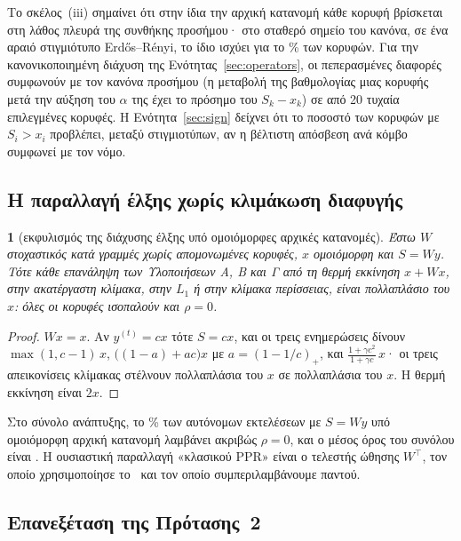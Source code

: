 \documentclass[11pt,a4paper]{article}
\theoremstyle{definition}
\theoremstyle{plain}
\newcommand{\genpropname}{}
\newtheorem*{genprop}{\genpropname}
\newenvironment{prop}[1]{\renewcommand{\genpropname}{Πρόταση #1}\begin{genprop}}{\end{genprop}}
\begin{document}
Το σκέλος~(iii) σημαίνει ότι στην ίδια την αρχική κατανομή κάθε κορυφή βρίσκεται στη λάθος πλευρά της συνθήκης προσήμου· στο σταθερό σημείο του κανόνα, σε ένα αραιό στιγμιότυπο Erdős--Rényi, το ίδιο ισχύει για το \SparseFracSbelowX\% των κορυφών. Για την κανονικοποιημένη διάχυση της Ενότητας~\ref{sec:operators}, οι πεπερασμένες διαφορές συμφωνούν με τον κανόνα προσήμου (η μεταβολή της βαθμολογίας μιας κορυφής μετά την αύξηση του $\alpha$ της έχει το πρόσημο του $S_k-x_k$) σε \SignAgree{} από 20 τυχαία επιλεγμένες κορυφές. Η Ενότητα~\ref{sec:sign} δείχνει ότι το ποσοστό των κορυφών με $S_i>x_i$ προβλέπει, μεταξύ στιγμιοτύπων, αν η βέλτιστη απόσβεση ανά κόμβο συμφωνεί με τον νόμο.

\subsection{Η παραλλαγή έλξης χωρίς κλιμάκωση διαφυγής}

\begin{prop}{F}[εκφυλισμός της διάχυσης έλξης υπό ομοιόμορφες αρχικές κατανομές]
Έστω $W$ στοχαστικός κατά γραμμές χωρίς απομονωμένες κορυφές, $x$ ομοιόμορφη και $S=Wy$. Τότε κάθε επανάληψη των Υλοποιήσεων Α, Β και Γ από τη θερμή εκκίνηση $x+Wx$, στην ακατέργαστη κλίμακα, στην $L_1$ ή στην κλίμακα περίσσειας, είναι πολλαπλάσιο του $x$: όλες οι κορυφές ισοπαλούν και $\rho=0$.
\end{prop}

\begin{proof}
$Wx=x$. Αν $y^{(t)}=cx$ τότε $S=cx$, και οι τρεις ενημερώσεις δίνουν $\max(1,c-1)\,x$, $\big((1-a)+ac\big)x$ με $a=(1-1/c)_+$, και $\frac{1+\gamma c^2}{1+\gamma c}\,x$· οι τρεις απεικονίσεις κλίμακας στέλνουν πολλαπλάσια του $x$ σε πολλαπλάσια του $x$. Η θερμή εκκίνηση είναι $2x$.
\end{proof}

Στο σύνολο ανάπτυξης, το \PullZeroPct\% των αυτόνομων εκτελέσεων με $S=Wy$ υπό ομοιόμορφη αρχική κατανομή λαμβάνει ακριβώς $\rho=0$, και ο μέσος όρος του συνόλου είναι \PullMean. Η ουσιαστική παραλλαγή «κλασικού PPR» είναι ο τελεστής ώθησης $W^{\top}$, τον οποίο χρησιμοποίησε το~\cite{konstantellos26} και τον οποίο συμπεριλαμβάνουμε παντού.

\subsection{Επανεξέταση της Πρότασης~2}\label{sec:prop2}
\end{document}
